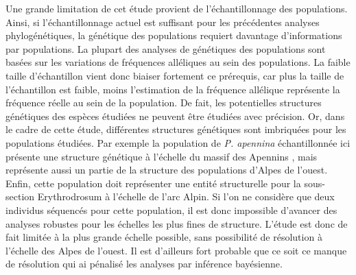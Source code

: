 Une grande limitation de cet étude provient de l'échantillonnage des populations.
 Ainsi, si l'échantillonnage actuel est suffisant pour les précédentes analyses phylogénétiques, la génétique des populations requiert davantage d'informations par populations.
 La plupart des analyses de génétiques des populations sont basées sur les variations de fréquences alléliques au sein des populations.
 La faible taille d'échantillon vient donc biaiser fortement ce prérequis, car plus la taille de l'échantillon est faible, moins l'estimation de la fréquence allélique représente la fréquence réelle au sein de la population.
 De fait, les potentielles structures génétiques des espèces étudiées ne peuvent être étudiées avec précision.
 Or, dans le cadre de cette étude, différentes structures génétiques sont imbriquées pour les populations étudiées.
 Par exemple la population de \textit{P. apennina} échantillonnée ici présente une structure génétique à l'échelle du massif des Apennins \citep{Crema2009}, mais représente aussi un partie de la structure des populations d'Alpes de l'ouest.
 Enfin, cette population doit représenter une entité structurelle pour la sous-section Erythrodrosum à l'échelle de l'arc Alpin.
 Si l'on ne considère que deux individus séquencés pour cette population, il est donc impossible d'avancer des analyses robustes pour les échelles les plus fines de structure.
 L'étude est donc de fait limitée à la plus grande échelle possible, sans possibilité de résolution à l'échelle des Alpes de l'ouest.
 Il est d'ailleurs fort probable que ce soit ce manque de résolution qui ai pénalisé les analyses par inférence bayésienne.


